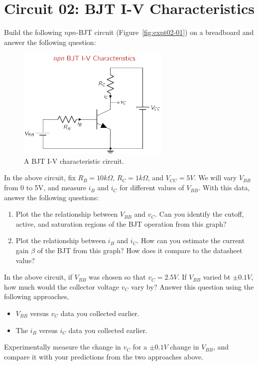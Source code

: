 \section{Circuit 02: BJT I-V Characteristics}
Build the following $npn$-BJT circuit (Figure~\ref{fig:expt02-01}) on a breadboard and answer the following question:
\begin{figure}[htbp]
    \centering
    \includegraphics[width=0.65\textwidth]{figures/expt02/expt02-bjt-iv.pdf}
    \caption{A BJT I-V characteristic circuit.}
    \label{fig:expt02-02}
\end{figure}
In the above circuit, fix $R_B = 10k\Omega$, $R_C = 1k\Omega$, and $V_{CC} = 5V$. We will vary $V_{BB}$ from 0 to 5V, and measure $i_B$ and $i_C$ for different values of $V_{BB}$. With this data, answer the following questions:
\begin{enumerate}
    \item Plot the the relationship between $V_{BB}$ and $v_C$. Can you identify the cutoff, active, and saturation regions of the BJT operation from this graph? 
    \item Plot the relationship between $i_B$ and $i_C$. How can you estimate the current gain $\beta$ of the BJT from this graph? How does it compare to the datasheet value?
\end{enumerate}

In the above circuit, if $V_{BB}$ was chosen so that $v_C = 2.5V$. If $V_{BB}$ varied bt $\pm 0.1V$, how much would the collector voltage $v_C$ vary by? Answer this question using the following approaches,
\begin{itemize}
    \item $V_{BB}$ versus $v_C$ data you collected earlier.
    \item The $i_B$ versus $i_C$ data you collected earlier.
\end{itemize}
Experimentally measure the change in $v_C$ for a $\pm 0.1V$ change in $V_{BB}$, and compare it with your predictions from the two approaches above.